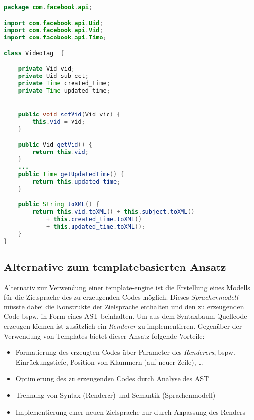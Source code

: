 \begin{lstlisting}[language=Java, label=lst:javaExample, caption=Beispiel für eine generierte Java-Datei aus \cref{lst:xsdVideoTag} (getter und setter gekürzt)]
package com.facebook.api;

import com.facebook.api.Uid;
import com.facebook.api.Vid;
import com.facebook.api.Time;

class VideoTag  {

    private Vid vid;
    private Uid subject;
    private Time created_time;
    private Time updated_time;


    public void setVid(Vid vid) {
        this.vid = vid;
    }

    public Vid getVid() {
        return this.vid;
    }
    ...
    public Time getUpdatedTime() {
        return this.updated_time;
    }

    public String toXML() {
        return this.vid.toXML() + this.subject.toXML()
            + this.created_time.toXML()
            + this.updated_time.toXML();
    }
}
\end{lstlisting}

\subsection{Alternative zum templatebasierten Ansatz}

Alternativ zur Verwendung einer \gls{template-engine} ist die Erstellung eines Modells für die Zielsprache des zu erzeugenden Codes möglich. Dieses \emph{Sprachenmodell} müsste dabei die Konstrukte der Zielsprache enthalten und den zu erzeugenden Code bspw. in Form eines \gls{AST} beinhalten.
Um aus dem Syntaxbaum Quellcode erzeugen können ist zusätzlich ein \emph{Renderer} zu implementieren. Gegenüber der Verwendung von Templates bietet dieser Ansatz folgende Vorteile:

\begin{itemize}
    \item Formatierung des erzeugten Codes über Parameter des \emph{Renderers}, bspw. Einrückungstiefe, Position von Klammern (auf neuer Zeile), \ldots
    \item Optimierung des zu erzeugenden Codes durch Analyse des \gls{AST}
    \item Trennung von Syntax (Renderer) und Semantik (Sprachenmodell)
    \item Implementierung einer neuen Zielsprache nur durch Anpassung des Renders
\end{itemize}

